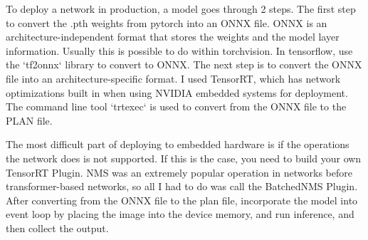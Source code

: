 \documentclass[12pt]{article}
\begin{document}
To deploy a network in production, a model goes through 2 steps. The first step to convert the .pth weights from pytorch into an ONNX file. \cite{metaTorchonnxDocumentation} ONNX is an architecture-independent format that stores the weights and the model layer information. Usually this is possible to do within torchvision. In tensorflow, use the `tf2onnx` library to convert to ONNX. \cite{Tensorflowonnx2024} The next step is to convert the ONNX file into an architecture-specific format. I used TensorRT, which has network optimizations built in when using NVIDIA embedded systems for deployment. \cite{NVIDIATensorRT2024} The command line tool `trtexec` is used to convert from the ONNX file to the PLAN file.

The most difficult part of deploying to embedded hardware is if the operations the network does is not supported. If this is the case, you need to build your own TensorRT Plugin. NMS was an extremely popular operation in networks before transformer-based networks, so all I had to do was call the BatchedNMS Plugin. \cite{TensorRTPluginBatchedNMSPlugin} After converting from the ONNX file to the plan file, incorporate the model into event loop by placing the image into the device memory, and run inference, and then collect the output.

\printbibliography
\end{document}
